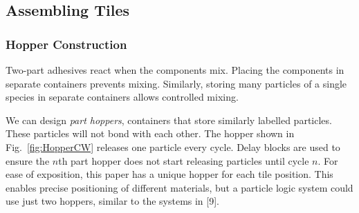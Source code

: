   
\subsection{Assembling Tiles}


\subsubsection{Hopper Construction}\label{subsec:HopperConstruction}
Two-part adhesives react when the components mix.  Placing the components in separate containers prevents mixing.  Similarly, storing many particles of a single species in separate containers allows controlled mixing.

We can design \emph{part hoppers}, containers that store similarly labelled particles.  These particles will not bond with each other.  The hopper shown in Fig.~\ref{fig:HopperCW} releases one particle every cycle. Delay blocks are used to ensure the $n$th part hopper does not start releasing particles until cycle $n$. For ease of exposition, this paper has a unique hopper for each tile position. This enables precise positioning of different materials, but a particle logic system could use just two hoppers, similar to the systems in [9].


